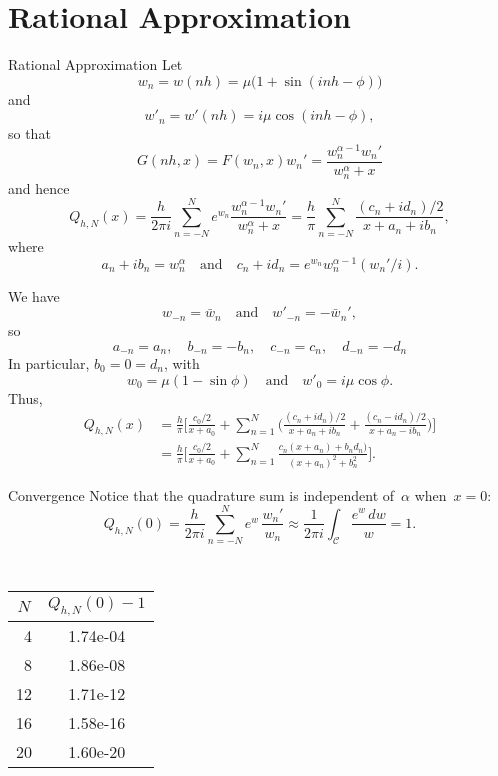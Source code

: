 \documentclass{beamer}
\begin{document}
\section{Rational Approximation}
\begin{frame}{Rational Approximation}
Let 
\[
w_n=w(nh)=\mu\bigl(1+\sin(inh-\phi)\bigr)
\]
and
\[
w'_n=w'(nh)=i\mu\cos(inh-\phi),
\]
so that
\[
G(nh,x)=F(w_n,x)w_n'=\frac{w_n^{\alpha-1}w_n'}{w_n^\alpha+x}
\]
and hence
\[
Q_{h,N}(x)=\frac{h}{2\pi i}\sum_{n=-N}^Ne^{w_n}
    \frac{w_n^{\alpha-1}w_n'}{w_n^\alpha+x}
    =\frac{h}{\pi}\sum_{n=-N}^N\frac{(c_n+id_n)/2}{x+a_n+ib_n},
\]
where
\[
a_n+ib_n=w_n^\alpha\quad\text{and}\quad
c_n+id_n=e^{w_n}w_n^{\alpha-1}(w_n'/i).
\]
\end{frame}
\begin{frame}
We have
\[
w_{-n}=\bar w_n\quad\text{and}\quad w'_{-n}=-\bar w_n',
\]
so
\[
a_{-n}=a_n,\quad b_{-n}=-b_n,\quad c_{-n}=c_n,\quad d_{-n}=-d_n
\]
In particular, $b_0=0=d_n$, with
\[
w_0=\mu(1-\sin\phi)\quad\text{and}\quad w'_0=i\mu\cos\phi.
\]
Thus,
\begin{align*}
Q_{h,N}(x)&=\frac{h}{\pi}\biggl[\frac{c_0/2}{x+a_0}+\sum_{n=1}^N
\biggl(\frac{(c_n+id_n)/2}{x+a_n+ib_n}+\frac{(c_n-id_n)/2}{x+a_n-ib_n}\biggr)
    \biggr]\\
&=\frac{h}{\pi}\biggl[\frac{c_0/2}{x+a_0}+\sum_{n=1}^N
    \frac{c_n(x+a_n)+b_nd_n)}{(x+a_n)^2+b_n^2}\biggr].
\end{align*}
\end{frame}
\begin{frame}{Convergence}
Notice that the quadrature sum is independent of~$\alpha$ when~$x=0$:
\[
Q_{h,N}(0)=\frac{h}{2\pi i}\sum_{n=-N}^Ne^w\,\frac{w_n'}{w_n}
    \approx\frac{1}{2\pi i}\int_{\mathcal{C}}\frac{e^w\,dw}{w}=1.
\]
\begin{center}
\renewcommand{\arraystretch}{1.2}
{\tt
\begin{tabular}{r|c}
\multicolumn{1}{c|}{$N$}&$Q_{h,N}(0)-1$\\
\hline
   4 &   1.74e-04 \\
   8 &   1.86e-08 \\
  12 &   1.71e-12 \\
  16 &   1.58e-16 \\
  20 &   1.60e-20 
\end{tabular}
}
\end{center}
\end{frame}

\end{document}
